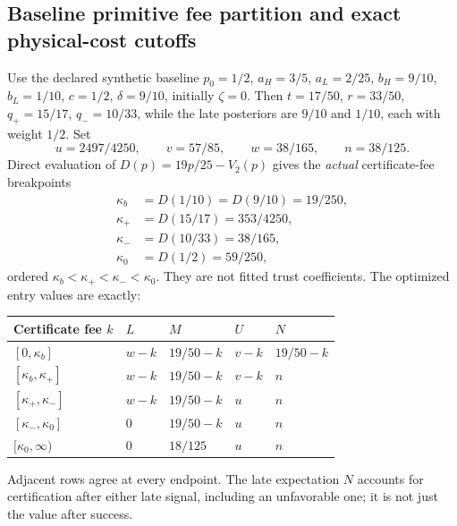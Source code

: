 \subsection{Baseline primitive fee partition and exact physical-cost cutoffs}\label{sec:baselinepartition}
Use the declared synthetic baseline $p_0=1/2$, $a_H=3/5$, $a_L=2/25$, $b_H=9/10$, $b_L=1/10$, $c=1/2$, $\delta=9/10$, initially $\zeta=0$. Then $t=17/50$, $r=33/50$, $q_+=15/17$, $q_-=10/33$, while the late posteriors are $9/10$ and $1/10$, each with weight $1/2$. Set
\[
 u=2497/4250,\qquad v=57/85,\qquad w=38/165,\qquad n=38/125.
\]
Direct evaluation of $D(p)=19p/25-V_2(p)$ gives the \emph{actual} certificate-fee breakpoints
\begin{align*}
 \kappa_b&=D(1/10)=D(9/10)=19/250,\\
 \kappa_+&=D(15/17)=353/4250,\\
 \kappa_-&=D(10/33)=38/165,\\
 \kappa_0&=D(1/2)=59/250,
\end{align*}
ordered $\kappa_b<\kappa_+<\kappa_-<\kappa_0$. They are not fitted trust coefficients. The optimized entry values are exactly:
\begin{center}\small
\begin{tabular}{lllll}\toprule
Certificate fee $k$ & $L$ & $M$ & $U$ & $N$\\\midrule
$[0,\kappa_b]$ & $w-k$ & $19/50-k$ & $v-k$ & $19/50-k$\\
$[\kappa_b,\kappa_+]$ & $w-k$ & $19/50-k$ & $v-k$ & $n$\\
$[\kappa_+,\kappa_-]$ & $w-k$ & $19/50-k$ & $u$ & $n$\\
$[\kappa_-,\kappa_0]$ & $0$ & $19/50-k$ & $u$ & $n$\\
$[\kappa_0,\infty)$ & $0$ & $18/125$ & $u$ & $n$\\\bottomrule
\end{tabular}
\end{center}
Adjacent rows agree at every endpoint. The late expectation $N$ accounts for certification after either late signal, including an unfavorable one; it is not just the value after success.

